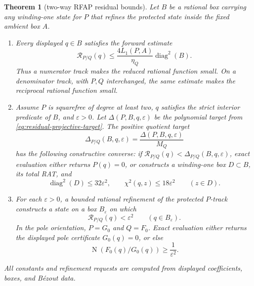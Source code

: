 \documentclass[11pt]{article}
\newtheorem{theorem}{Theorem}[section]
\newcommand{\Norm}[1]{\operatorname{N}\!\left(#1\right)}
\newcommand{\diamq}{\operatorname{diag}^{2}}
\newcommand{\eps}{\varepsilon}
\begin{document}
\begin{theorem}[two-way RFAP residual bounds]
\label{thm:rfap-residual-bounds}
Let $B$ be a rational box carrying any winding-one state for $P$ that refines
the protected state inside the fixed ambient box $A$.
\begin{enumerate}[label=(\roman*)]
\item Every displayed $q\in B$ satisfies the forward estimate
\begin{equation}
\label{eq:rfap-forward-residual}
 \mathcal R_{P/Q}(q)
 \le \frac{4L_1(P,A)}{\eta_Q}\diamq(B).
\end{equation}
Thus a numerator track makes the reduced rational function small.  On a
denominator track, with $P,Q$ interchanged, the same estimate makes the
reciprocal rational function small.
\item Assume $P$ is squarefree of degree at least two, $q$ satisfies the
strict interior predicate of $B$, and $\eps>0$.  Let
$\Delta(P,B,q,\eps)$ be the polynomial target from
\cref{eq:residual-projective-target}.  The positive quotient target
\begin{equation}
\label{eq:rfap-converse-target}
       \Delta_{P/Q}(B,q,\eps)=\frac{\Delta(P,B,q,\eps)}{M_Q}
\end{equation}
has the following constructive converse: if
$\mathcal R_{P/Q}(q)<\Delta_{P/Q}(B,q,\eps)$, exact evaluation either returns
$P(q)=0$, or constructs a winding-one box $D\subset B$, its total RAT, and
\[
 \diamq(D)\le32\eps^2,
 \qquad \chi^2(q,z)\le18\eps^2\qquad(z\in D).
\]
\item For each $\eps>0$, a bounded rational refinement of the protected
$P$-track constructs a state on a box $B_\eps$ on which
\begin{equation}
\label{eq:rfap-epsilon-residual}
              \mathcal R_{P/Q}(q)<\eps^2
              \qquad(q\in B_\eps).
\end{equation}
In the pole orientation, $P=G_0$ and $Q=F_0$.  Exact evaluation either
returns the displayed pole certificate $G_0(q)=0$, or else
\begin{equation}
\label{eq:rfap-pole-blowup}
              \Norm{F_0(q)/G_0(q)}\ge\frac{1}{\eps^2}.
\end{equation}
\end{enumerate}
All constants and refinement requests are computed from displayed
coefficients, boxes, and Bézout data.
\end{theorem}
\end{document}
